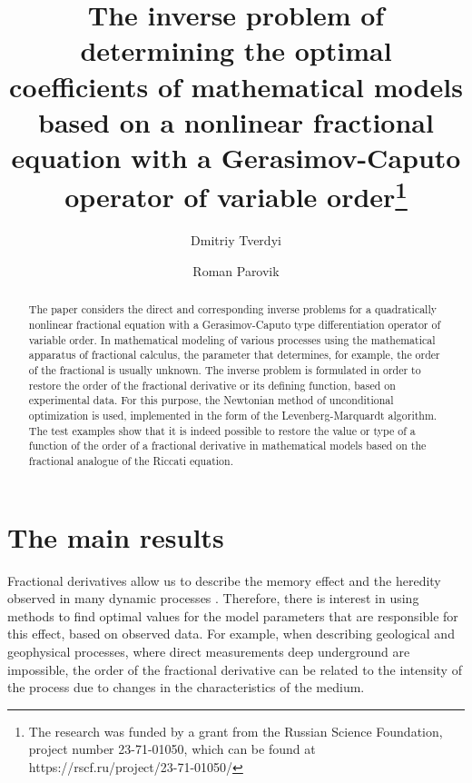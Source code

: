 \documentclass[12pt]{llncs}
\begin{document}
\fi

\title{The inverse problem of determining the optimal coefficients of mathematical models based on a nonlinear fractional equation with a Gerasimov-Caputo operator of variable order\thanks{The research was funded by a grant from the Russian Science Foundation, project number 23-71-01050, which can be found at https://rscf.ru/project/23-71-01050/}}

\author{Dmitriy Tverdyi  \and  Roman Parovik
}

\maketitle

\begin{abstract}
The paper considers the direct and corresponding inverse problems for a quadratically nonlinear fractional equation with a Gerasimov-Caputo type differentiation operator of variable order. In mathematical modeling of various processes using the mathematical apparatus of fractional calculus, the parameter that determines, for example, the order of the fractional is usually unknown. The inverse problem is formulated in order to restore the order of the fractional derivative or its defining function, based on experimental data. For this purpose, the Newtonian method of unconditional optimization is used, implemented in the form of the Levenberg-Marquardt algorithm. The test examples show that it is indeed possible to restore the value or type of a function of the order of a fractional derivative in mathematical models based on the fractional analogue of the Riccati equation.

\end{abstract}

\section{The main results} %

Fractional derivatives allow us to describe the memory effect and the heredity observed in many dynamic processes \cite{Volterra_1912_equations}. Therefore, there is interest in using methods to find optimal values for the model parameters that are responsible for this effect, based on observed data.
For example, when describing geological and geophysical processes, where direct measurements deep underground are impossible, the order of the fractional derivative can be related to the intensity of the process due to changes in the characteristics of the medium\cite{Tarantola_1987_Inv_theor}.
\end{document}
